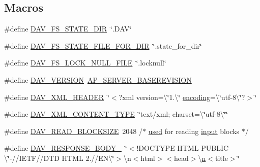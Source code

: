 \subsection*{Macros}
\begin{DoxyCompactItemize}
\item 
\#define \hyperlink{group__MOD__DAV_gac9ca5f5d53f363ef65dddfec5060f234}{D\+A\+V\+\_\+\+F\+S\+\_\+\+S\+T\+A\+T\+E\+\_\+\+D\+IR}~\char`\"{}.D\+AV\char`\"{}
\item 
\#define \hyperlink{group__MOD__DAV_ga45e66917592ee7f878c02985b9ac3443}{D\+A\+V\+\_\+\+F\+S\+\_\+\+S\+T\+A\+T\+E\+\_\+\+F\+I\+L\+E\+\_\+\+F\+O\+R\+\_\+\+D\+IR}~\char`\"{}.state\+\_\+for\+\_\+dir\char`\"{}
\item 
\#define \hyperlink{group__MOD__DAV_gadd166fdc69c4248db087f41b17b4ba0b}{D\+A\+V\+\_\+\+F\+S\+\_\+\+L\+O\+C\+K\+\_\+\+N\+U\+L\+L\+\_\+\+F\+I\+LE}~\char`\"{}.locknull\char`\"{}
\item 
\#define \hyperlink{group__MOD__DAV_gaf17ddfe12ada03a45c94d0118f3d98ed}{D\+A\+V\+\_\+\+V\+E\+R\+S\+I\+ON}~\hyperlink{ap__release_8h_ac3c1bba908df6cbf4e708ef771eac28a}{A\+P\+\_\+\+S\+E\+R\+V\+E\+R\+\_\+\+B\+A\+S\+E\+R\+E\+V\+I\+S\+I\+ON}
\item 
\#define \hyperlink{group__MOD__DAV_ga09257098b526bed329d659455dca36c1}{D\+A\+V\+\_\+\+X\+M\+L\+\_\+\+H\+E\+A\+D\+ER}~\char`\"{}$<$?xml version=\textbackslash{}\char`\"{}1.\textbackslash{}\char`\"{} \hyperlink{mod__mime__magic_8c_abfd0452ce0a5ba319ea4d624dc209250}{encoding}=\textbackslash{}\char`\"{}utf-\/8\textbackslash{}\char`\"{}?$>$\char`\"{}
\item 
\#define \hyperlink{group__MOD__DAV_gac3871a7e80b1d24a0fe3ca946e546c64}{D\+A\+V\+\_\+\+X\+M\+L\+\_\+\+C\+O\+N\+T\+E\+N\+T\+\_\+\+T\+Y\+PE}~\char`\"{}text/xml; charset=\textbackslash{}\char`\"{}utf-\/8\textbackslash{}\char`\"{}\char`\"{}
\item 
\#define \hyperlink{group__MOD__DAV_ga466c473ff062d9669609a53aaee8e07c}{D\+A\+V\+\_\+\+R\+E\+A\+D\+\_\+\+B\+L\+O\+C\+K\+S\+I\+ZE}~2048    /$\ast$ \hyperlink{pcregrep_8txt_ac199431a7baad211fadcdb6c45bfe7c0}{used} for reading \hyperlink{perltest_8txt_a1d3f4df61ab6d72e9cfd2de361e2a85b}{input} blocks $\ast$/
\item 
\#define \hyperlink{group__MOD__DAV_ga7f0849cc23f9c9ad4e05df187d82f76f}{D\+A\+V\+\_\+\+R\+E\+S\+P\+O\+N\+S\+E\+\_\+\+B\+O\+D\+Y\+\_}~\char`\"{}$<$!D\+O\+C\+T\+Y\+PE H\+T\+ML P\+U\+B\+L\+IC \textbackslash{}\char`\"{}-\///I\+E\+TF//D\+TD H\+T\+ML 2.//E\+N\textbackslash{}\char`\"{}$>$\textbackslash{}n$<$html$>$$<$head$>$\textbackslash{}\hyperlink{pcregrep_8txt_ab232d334efb9173a12ae2940d035f460}{n}$<$title$>$\char`\"{}
$$
\end{DoxyCompactItemize}
